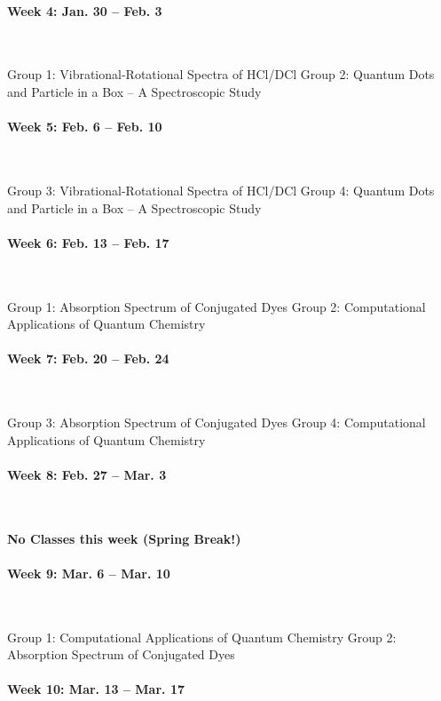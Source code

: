 \documentclass[12pt, letterpaper]{article}
\begin{document}
\paragraph{Week 4: Jan. 30 -- Feb. 3}~

Group 1: Vibrational-Rotational Spectra of HCl/DCl
Group 2: Quantum Dots and Particle in a Box – A Spectroscopic Study
\paragraph{Week 5: Feb. 6 -- Feb. 10}~

Group 3: Vibrational-Rotational Spectra of HCl/DCl
Group 4: Quantum Dots and Particle in a Box – A Spectroscopic Study

\paragraph{Week 6: Feb. 13 -- Feb. 17}~

Group 1: Absorption Spectrum of Conjugated Dyes
Group 2: Computational Applications of Quantum Chemistry

\paragraph{Week 7: Feb. 20 -- Feb. 24}~

Group 3: Absorption Spectrum of Conjugated Dyes
Group 4: Computational Applications of Quantum Chemistry

\paragraph{Week 8: Feb. 27 -- Mar. 3}~

\textbf{No Classes this week (Spring Break!)}

\paragraph{Week 9: Mar. 6 -- Mar. 10}~

Group 1: Computational Applications of Quantum Chemistry
Group 2: Absorption Spectrum of Conjugated Dyes

\paragraph{Week 10: Mar. 13 -- Mar. 17}~
\end{document}

